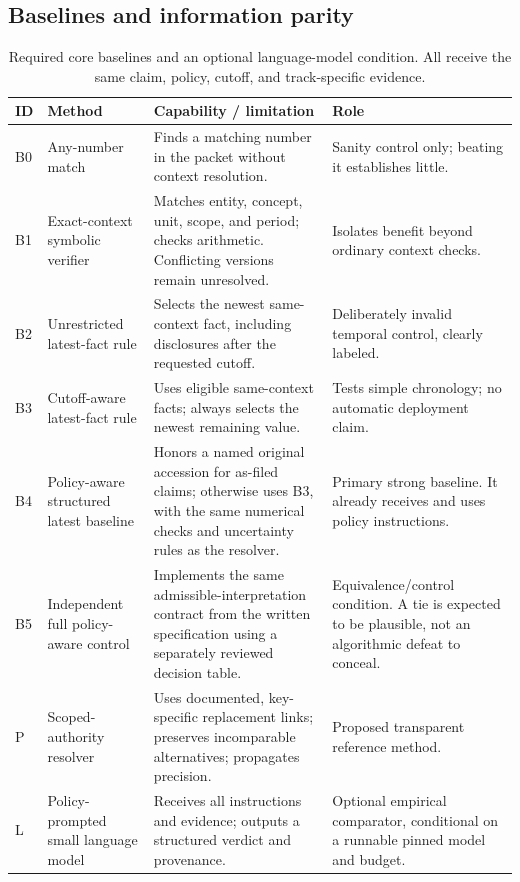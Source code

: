 \documentclass[11pt,a4paper]{article}
\begin{document}
\subsection{Baselines and information parity}
\begingroup\small
\begin{table}[H]\caption{Required core baselines and an optional language-model condition. All receive the same claim, policy, cutoff, and track-specific evidence.}
\small\begin{tabularx}{\linewidth}{p{.07\linewidth}>{\raggedright\arraybackslash}p{.24\linewidth}YY}\toprule
ID & Method & Capability / limitation & Role\\\midrule
B0 & Any-number match & Finds a matching number in the packet without context resolution. & Sanity control only; beating it establishes little.\\
B1 & Exact-context symbolic verifier & Matches entity, concept, unit, scope, and period; checks arithmetic. Conflicting versions remain unresolved. & Isolates benefit beyond ordinary context checks.\\
B2 & Unrestricted latest-fact rule & Selects the newest same-context fact, including disclosures after the requested cutoff. & Deliberately invalid temporal control, clearly labeled.\\
B3 & Cutoff-aware latest-fact rule & Uses eligible same-context facts; always selects the newest remaining value. & Tests simple chronology; no automatic deployment claim.\\
B4 & Policy-aware structured latest baseline & Honors a named original accession for as-filed claims; otherwise uses B3, with the same numerical checks and uncertainty rules as the resolver. & Primary strong baseline. It already receives and uses policy instructions.\\
B5 & Independent full policy-aware control & Implements the same admissible-interpretation contract from the written specification using a separately reviewed decision table. & Equivalence/control condition. A tie is expected to be plausible, not an algorithmic defeat to conceal.\\
P & Scoped-authority resolver & Uses documented, key-specific replacement links; preserves incomparable alternatives; propagates precision. & Proposed transparent reference method.\\
L & Policy-prompted small language model & Receives all instructions and evidence; outputs a structured verdict and provenance. & Optional empirical comparator, conditional on a runnable pinned model and budget.\\\bottomrule
\end{tabularx}\end{table}
\end{document}
